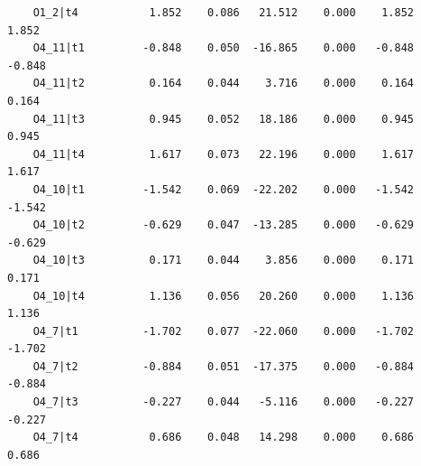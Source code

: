 \documentclass[
  letterpaper,
  DIV=11,
  numbers=noendperiod]{scrartcl}
\begin{document}
\begin{verbatim}
    O1_2|t4           1.852    0.086   21.512    0.000    1.852    1.852
    O4_11|t1         -0.848    0.050  -16.865    0.000   -0.848   -0.848
    O4_11|t2          0.164    0.044    3.716    0.000    0.164    0.164
    O4_11|t3          0.945    0.052   18.186    0.000    0.945    0.945
    O4_11|t4          1.617    0.073   22.196    0.000    1.617    1.617
    O4_10|t1         -1.542    0.069  -22.202    0.000   -1.542   -1.542
    O4_10|t2         -0.629    0.047  -13.285    0.000   -0.629   -0.629
    O4_10|t3          0.171    0.044    3.856    0.000    0.171    0.171
    O4_10|t4          1.136    0.056   20.260    0.000    1.136    1.136
    O4_7|t1          -1.702    0.077  -22.060    0.000   -1.702   -1.702
    O4_7|t2          -0.884    0.051  -17.375    0.000   -0.884   -0.884
    O4_7|t3          -0.227    0.044   -5.116    0.000   -0.227   -0.227
    O4_7|t4           0.686    0.048   14.298    0.000    0.686    0.686


\end{verbatim}
\end{document}
